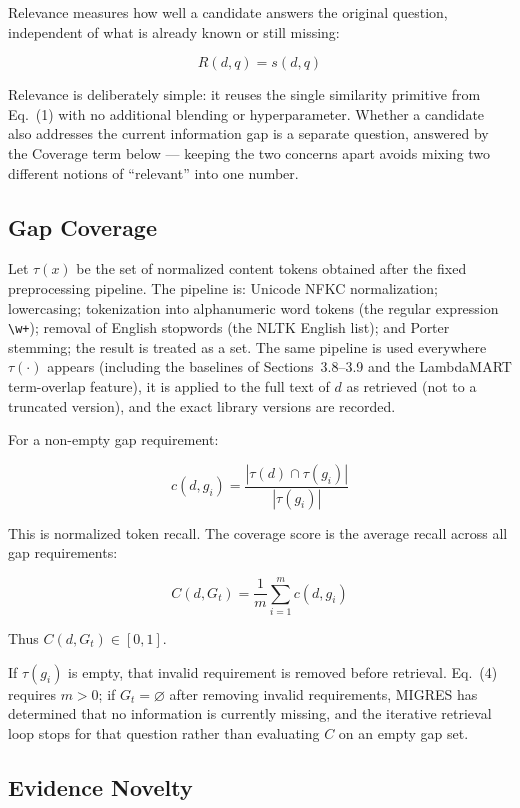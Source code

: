 \documentclass[11pt,a4paper]{article}
\begin{document}
Relevance measures how well a candidate answers the original question, independent of what is already known or still missing:

\[
\boxed{
R(d,q)
=
s(d,q)
}
\tag{2}
\]

Relevance is deliberately simple: it reuses the single similarity primitive from Eq.~(1) with no additional blending or hyperparameter. Whether a candidate also addresses the current information gap is a separate question, answered by the Coverage term below --- keeping the two concerns apart avoids mixing two different notions of ``relevant'' into one number.

\subsection{Gap Coverage}

Let $\tau(x)$ be the set of normalized content tokens obtained after the fixed preprocessing pipeline. The pipeline is: Unicode NFKC normalization; lowercasing; tokenization into alphanumeric word tokens (the regular expression \texttt{\textbackslash w+}); removal of English stopwords (the NLTK English list); and Porter stemming; the result is treated as a set. The same pipeline is used everywhere $\tau(\cdot)$ appears (including the baselines of Sections~3.8--3.9 and the LambdaMART term-overlap feature), it is applied to the full text of $d$ as retrieved (not to a truncated version), and the exact library versions are recorded.

For a non-empty gap requirement:

\[
\boxed{
c(d,g_i)
=
\frac{
|\tau(d)\cap\tau(g_i)|
}{
|\tau(g_i)|
}
}
\tag{3}
\]

This is normalized token recall. The coverage score is the average recall across all gap requirements:

\[
\boxed{
C(d,G_t)
=
\frac{1}{m}
\sum_{i=1}^{m}c(d,g_i)
}
\tag{4}
\]

Thus $C(d,G_t)\in[0,1]$.

If $\tau(g_i)$ is empty, that invalid requirement is removed before retrieval. Eq.~(4) requires $m>0$; if $G_t=\varnothing$ after removing invalid requirements, MIGRES has determined that no information is currently missing, and the iterative retrieval loop stops for that question rather than evaluating $C$ on an empty gap set.

\subsection{Evidence Novelty}
\end{document}
